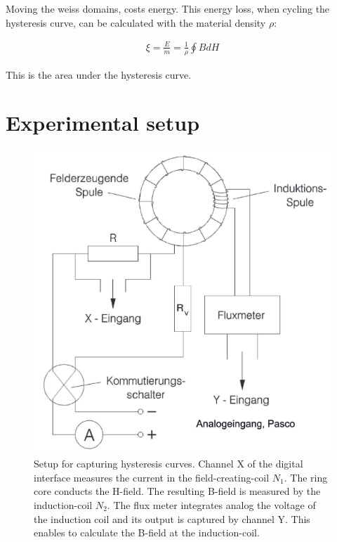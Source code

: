 \documentclass[a4paper,10pt,twocolumn]{article}
\begin{document}
    Moving the weiss domains, costs energy.
    This energy loss, when cycling the hysteresis curve, can be calculated with the material density $\rho$:
    
    \begin{align}
        \label{eq:EnergyLoss}
        \xi = \frac{E}{m} = \frac{1}{\rho} \oint{B dH}
    \end{align}
    
    This is the area under the hysteresis curve.
    
    \section{Experimental setup}
    
    \begin{figure}[htbp]
        \includegraphics[width=0.9\linewidth]{ExperimentalSetup}
        \caption{Setup for capturing hysteresis curves.
        Channel X of the digital interface measures the current in the field-creating-coil $N_1$.
        The ring core conducts the H-field.
        The resulting B-field is measured by the induction-coil $N_2$.
        The flux meter integrates analog the voltage of the induction coil and its output is captured by
        channel Y.
        This enables to calculate the B-field at the induction-coil.}
        \label{fig:ExperimentalSetup}
    \end{figure}
    
\end{document}

